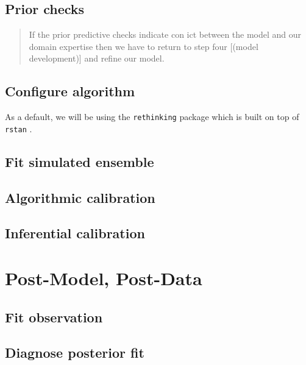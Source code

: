 \documentclass[11pt, oneside]{book}
\begin{document}
\hypertarget{prior-checks}{%
\subsection{Prior checks}\label{prior-checks}}

\begin{quote}
If the prior predictive checks indicate con ict between the model and our domain expertise then we have to return to step four {[}(model development){]} and refine our model.
\end{quote}

\hypertarget{configure-algorithm}{%
\subsection{Configure algorithm}\label{configure-algorithm}}

As a default, we will be using the \texttt{rethinking} package \citep{R-rethinking} which is built on top of \texttt{rstan} \citep{R-rstan}.

\hypertarget{fit-simulated-ensemble}{%
\subsection{Fit simulated ensemble}\label{fit-simulated-ensemble}}

\hypertarget{algorithmic-calibration}{%
\subsection{Algorithmic calibration}\label{algorithmic-calibration}}

\hypertarget{inferential-calibration}{%
\subsection{Inferential calibration}\label{inferential-calibration}}

\hypertarget{post-model-post-data}{%
\section{Post-Model, Post-Data}\label{post-model-post-data}}

\hypertarget{fit-observation}{%
\subsection{Fit observation}\label{fit-observation}}

\hypertarget{diagnose-posterior-fit}{%
\subsection{Diagnose posterior fit}\label{diagnose-posterior-fit}}
\end{document}
